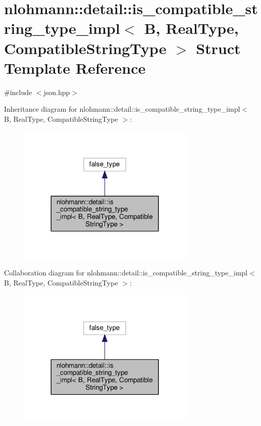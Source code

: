 \hypertarget{structnlohmann_1_1detail_1_1is__compatible__string__type__impl}{}\section{nlohmann\+:\+:detail\+:\+:is\+\_\+compatible\+\_\+string\+\_\+type\+\_\+impl$<$ B, Real\+Type, Compatible\+String\+Type $>$ Struct Template Reference}
\label{structnlohmann_1_1detail_1_1is__compatible__string__type__impl}


{\ttfamily \#include $<$json.\+hpp$>$}



Inheritance diagram for nlohmann\+:\+:detail\+:\+:is\+\_\+compatible\+\_\+string\+\_\+type\+\_\+impl$<$ B, Real\+Type, Compatible\+String\+Type $>$\+:
\nopagebreak
\begin{figure}[H]
\begin{center}
\leavevmode
\includegraphics[width=239pt]{structnlohmann_1_1detail_1_1is__compatible__string__type__impl__inherit__graph}
\end{center}
\end{figure}


Collaboration diagram for nlohmann\+:\+:detail\+:\+:is\+\_\+compatible\+\_\+string\+\_\+type\+\_\+impl$<$ B, Real\+Type, Compatible\+String\+Type $>$\+:
\nopagebreak
\begin{figure}[H]
\begin{center}
\leavevmode
\includegraphics[width=239pt]{structnlohmann_1_1detail_1_1is__compatible__string__type__impl__coll__graph}
\end{center}
\end{figure}


